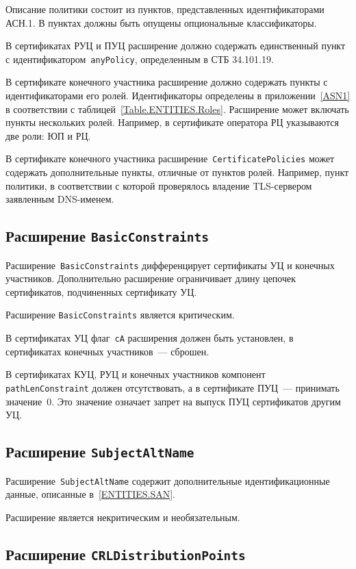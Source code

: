 Описание политики состоит из пунктов, представленных идентификаторами 
АСН.1. В пунктах должны быть опущены опциональные классификаторы. 

В сертификатах РУЦ и ПУЦ расширение должно содержать единственный пункт
с идентификатором~\texttt{anyPolicy}, определенным в СТБ 34.101.19.

В сертификате конечного участника расширение 
должно содержать пункты с идентификаторами его ролей.
Идентификаторы определены в приложении~\ref{ASN1}
в соответствии с таблицей~\ref{Table.ENTITIES.Roles}. 
Расширение может включать пункты нескольких ролей.
Например, в сертификате оператора РЦ указываются две роли: ЮП и РЦ.

В сертификате конечного участника расширение~\texttt{CertificatePolicies} 
может содержать дополнительные пункты, отличные от пунктов 
ролей. Например, пункт политики, в соответствии с которой 
проверялось владение TLS-сервером заявленным DNS-именем.

\subsection{Расширение \texttt{BasicConstraints}}

Расширение~\texttt{BasicConstraints} дифференцирует сертификаты УЦ и
конечных участников. Дополнительно расширение ограничивает 
длину цепочек сертификатов, подчиненных сертификату УЦ.

Расширение \texttt{BasicConstraints} является критическим.

В сертификатах УЦ флаг~\texttt{сA} расширения должен быть 
установлен, в сертификатах конечных участников~--- сброшен. 

В сертификатах КУЦ, РУЦ и конечных участников компонент 
\texttt{pathLenConstraint} должен отсутствовать,
а в сертификате ПУЦ~--- принимать значение~0. 
Это значение означает запрет на выпуск ПУЦ сертификатов 
другим УЦ. 

\subsection{Расширение \texttt{SubjectAltName}}

Расширение~\texttt{SubjectAltName} содержит дополнительные 
идентификационные данные, описанные в~\ref{ENTITIES.SAN}. 

Расширение является некритическим и необязательным.

\subsection{Расширение \texttt{CRLDistributionPoints}}

